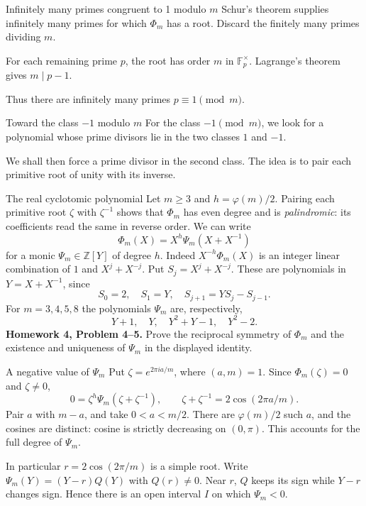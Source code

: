 \documentclass[aspectratio=169,11pt]{beamer}
\newcommand{\Z}{\mathbb Z}
\newcommand{\F}{\mathbb F}
\newcommand{\HW}[2]{{\color{teal}\textbf{Homework #1, Problem #2.}}}
\begin{document}
\begin{frame}{Infinitely many primes congruent to 1 modulo $m$}
Schur's theorem supplies infinitely many primes for which $\Phi_m$ has a root. Discard the finitely many primes dividing $m$.

For each remaining prime $p$, the root has order $m$ in $\F_p^\times$. Lagrange's theorem gives $m\mid p-1$.

Thus there are infinitely many primes $p\equiv1\pmod m$.
\end{frame}
\begin{frame}{Toward the class $-1$ modulo $m$}
For the class $-1\pmod m$, we look for a polynomial whose prime divisors lie in the two classes $1$ and $-1$.

We shall then force a prime divisor in the second class. The idea is to pair each primitive root of unity with its inverse.
\end{frame}
\begin{frame}{The real cyclotomic polynomial}
\small
Let $m\ge3$ and $h=\varphi(m)/2$. Pairing each primitive root $\zeta$ with $\zeta^{-1}$ shows that $\Phi_m$ has even degree and is \emph{palindromic}: its coefficients read the same in reverse order. We can write
\[\Phi_m(X)=X^h\Psi_m(X+X^{-1})\]
for a monic $\Psi_m\in\Z[Y]$ of degree $h$. Indeed $X^{-h}\Phi_m(X)$ is an integer linear combination of $1$ and $X^j+X^{-j}$. Put $S_j=X^j+X^{-j}$. These are polynomials in $Y=X+X^{-1}$, since
\[S_0=2,\quad S_1=Y,\quad S_{j+1}=YS_j-S_{j-1}.\]
For $m=3,4,5,8$ the polynomials $\Psi_m$ are, respectively,
\[Y+1,\quad Y,\quad Y^2+Y-1,\quad Y^2-2.\]
\HW{4}{4--5} Prove the reciprocal symmetry of $\Phi_m$ and the existence and uniqueness of $\Psi_m$ in the displayed identity.
\end{frame}
\begin{frame}{A negative value of $\Psi_m$}
Put $\zeta=e^{2\pi ia/m}$, where $(a,m)=1$. Since $\Phi_m(\zeta)=0$ and $\zeta\ne0$,
\[0=\zeta^h\Psi_m(\zeta+\zeta^{-1}),\qquad
\zeta+\zeta^{-1}=2\cos(2\pi a/m).\]
Pair $a$ with $m-a$, and take $0<a<m/2$. There are $\varphi(m)/2$ such $a$, and the cosines are distinct: cosine is strictly decreasing on $(0,\pi)$. This accounts for the full degree of $\Psi_m$.

In particular $r=2\cos(2\pi/m)$ is a simple root. Write $\Psi_m(Y)=(Y-r)Q(Y)$ with $Q(r)\ne0$. Near $r$, $Q$ keeps its sign while $Y-r$ changes sign. Hence there is an open interval $I$ on which $\Psi_m<0$.
\end{frame}
\end{document}
